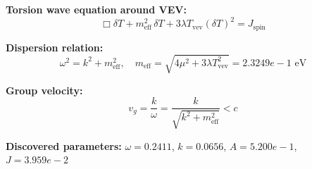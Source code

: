 
\textbf{Torsion wave equation around VEV:}
\begin{equation}
  \Box \delta T + m_{\text{eff}}^2 \, \delta T + 3\lambda T_{\text{vev}} (\delta T)^2 = J_{\text{spin}}
\end{equation}

\textbf{Dispersion relation:}
\begin{equation}
  \omega^2 = k^2 + m_{\text{eff}}^2, \quad
  m_{\text{eff}} = \sqrt{4\mu^2 + 3\lambda T_{\text{vev}}^2} = 2.3249e-1 \text{ eV}
\end{equation}

\textbf{Group velocity:}
\begin{equation}
  v_g = \frac{k}{\omega} = \frac{k}{\sqrt{k^2 + m_{\text{eff}}^2}} < c
\end{equation}

\textbf{Discovered parameters:}
$\omega = 0.2411$, \quad
$k = 0.0656$, \quad
$A = 5.200e-1$, \quad
$J = 3.959e-2$